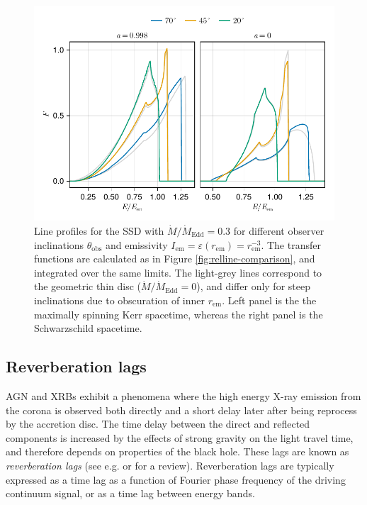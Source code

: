 \documentclass[fleqn,usenatbib]{mnras}
\begin{document}
\begin{figure}
	\centering
	\includegraphics[width=0.99\linewidth]{figures/lineprofiles.ssd.pdf}
	\caption{Line profiles for the SSD with $\dot{M} / \dot{M}_\text{Edd} = 0.3$ for different observer inclinations $\theta_\text{obs}$ and emissivity $I_\text{em} = \varepsilon(r_\text{em}) = r_\text{em}^{-3}$. The transfer functions are calculated as in Figure \ref{fig:relline-comparison}, and integrated over the same limits. The light-grey lines correspond to the geometric thin disc ($\dot{M} / \dot{M}_\text{Edd} = 0$), and differ only for steep inclinations due to obscuration of inner $r_\text{em}$. Left panel is the the maximally spinning Kerr spacetime, whereas the right panel is the Schwarzschild spacetime.}
	\label{fig:line-profile-ssd}
\end{figure}


\subsection{Reverberation lags}
\label{sec:lag-transfer-functions}

AGN and XRBs exhibit a phenomena where the high energy X-ray emission from the
corona is observed both directly and a short delay later after being reprocess
by the accretion disc. The time delay between the direct and reflected
components is increased by the effects of strong gravity on the light travel
time, and therefore depends on properties of the black hole. These lags are
known as \textit{reverberation lags} (see e.g. \cite{uttley_x-ray_2014} or
\cite{cackett_reverberation_2021} for a review). Reverberation lags are
typically expressed as a time lag as a function of Fourier phase frequency of
the driving continuum signal, or as a time lag between energy bands.
\end{document}
